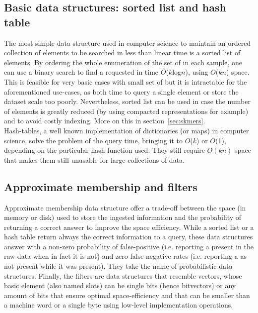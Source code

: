 \subsection{Basic data structures: sorted list and hash table}
The most simple data structure used in computer science to maintain an ordered collection of elements to be searched in less than linear time is a sorted list of elements. By ordering the whole enumeration of the set of \kmers in each sample, one can use a binary search to find a requested \kmer in time $O$($k$log$n$), using $O$($kn$) space. This is feasible for very basic cases with small set of \kmers but it is intractable for the aforementioned use-cases, as both time to query a single element or store the dataset scale too poorly. Nevertheless, sorted list can be used in case the number of elements is greatly reduced (by using compacted \kmer representations for example) and to avoid costly indexing. More on this in section~\ref{sec:skmers}.\\
Hash-tables, a well known implementation of dictionaries (or maps) in computer science, solve the problem of the query time, bringing it to $O$($k$) or $O$(1), depending on the particular hash function used. They still require $O(kn)$ space that makes them still unusable for large collections of data. 

\subsection{Approximate membership and filters}
Approximate membership data structure offer a trade-off between the space (in memory or disk) used to store the ingested information and the probability of returning a correct answer
to improve the space efficiency. While a sorted list or a hash table return always the correct information to a query, these data structures answer with a non-zero probability of false-positive (i.e. reporting a \kmer present in the raw data when in fact it is not) and zero false-negative rates (i.e. reporting a \kmer as not present while it was present). They take the name of probabilistic data structures. Finally, the filters are data structures that resemble vectors, whose basic element (also named slots) can be single bits (hence bitvectors) or any amount of bits that ensure optimal space-efficiency and that can be smaller than a machine word or a single byte using low-level implementation operations.
